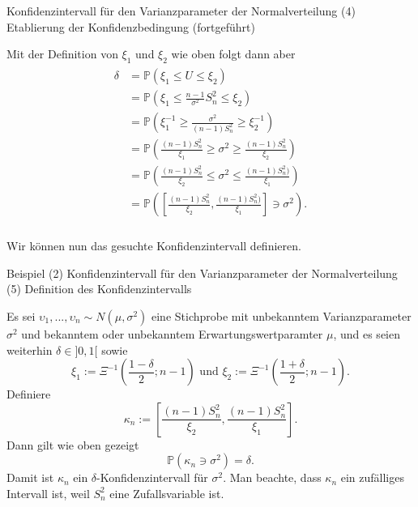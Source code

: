 \documentclass[
  8pt,
  ignorenonframetext,
]{beamer}
\newcommand{\ups} {\upsilon}
\begin{document}
\begin{frame}{Konfidenzintervall für den Varianzparameter der
Normalverteilung}
\protect\hypertarget{konfidenzintervall-fuxfcr-den-varianzparameter-der-normalverteilung-4}{}
\noindent (4) Etablierung der Konfidenzbedingung (fortgeführt)

\small

Mit der Definition von \(\xi_1\) und \(\xi_2\) wie oben folgt dann aber
\footnotesize \begin{align}
\begin{split}
\delta
& = \mathbb{P}\left(\xi_1 \le U \le \xi_2 \right)                                                           \\
& = \mathbb{P}\left(\xi_1 \le \frac{n-1}{\sigma^2}S^2_n  \le \xi_2 \right)                                  \\
& = \mathbb{P}\left(\xi_1^{-1} \ge \frac{\sigma^2}{(n-1)S^2_n} \ge \xi_2^{-1} \right)                       \\
& = \mathbb{P}\left(\frac{(n-1)S^2_n}{\xi_1} \ge \sigma^2 \ge \frac{(n-1)S^2_n}{\xi_2} \right)              \\
& = \mathbb{P}\left(\frac{(n-1)S^2_n}{\xi_2} \le \sigma^2 \le \frac{(n-1)S^2_n)}{\xi_1} \right)             \\
& = \mathbb{P}\left(\left[\frac{(n-1)S^2_n}{\xi_2}, \frac{(n-1)S^2_n)}{\xi_1}\right] \ni \sigma^2 \right).  \\
\end{split}
\end{align}

\small

Wir können nun das gesuchte Konfidenzintervall definieren.
\end{frame}

\begin{frame}{\small Beispiel (2) Konfidenzintervall für den
Varianzparameter der Normalverteilung}
\protect\hypertarget{beispiel-2-konfidenzintervall-fuxfcr-den-varianzparameter-der-normalverteilung}{}
\noindent(5) Definition des Konfidenzintervalls \small

Es sei \(\ups_1,...,\ups_n \sim N(\mu,\sigma^2)\) eine Stichprobe mit
unbekanntem Varianzparameter \(\sigma^2\) und bekanntem oder unbekanntem
Erwartungswertparamter \(\mu\), und es seien weiterhin
\(\delta \in ]0,1[\) sowie \begin{equation}
\xi_1 := \Xi^{-1}\left(\frac{1 - \delta}{2};n-1 \right) \mbox{ und }
\xi_2 := \Xi^{-1}\left(\frac{1 + \delta}{2};n-1 \right). 
\end{equation} Definiere \begin{equation}
\kappa_n := \left[\frac{(n-1)S^2_n}{\xi_2}, \frac{(n-1)S^2_n}{\xi_1}\right].
\end{equation} Dann gilt wie oben gezeigt \begin{equation}
\mathbb{P}(\kappa_n \ni \sigma^2) = \delta.
\end{equation} Damit ist \(\kappa_n\) ein \(\delta\)-Konfidenzintervall
für \(\sigma^2\). Man beachte, dass \(\kappa_n\) ein zufälliges
Intervall ist, weil \(S^2_n\) eine Zufallsvariable ist.
\end{frame}
\end{document}
